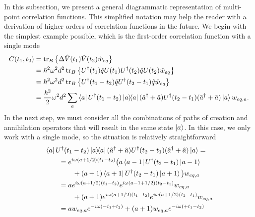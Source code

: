 In this subsection, we present a general diagrammatic representation of multi-point correlation functions. This simplified notation may help the reader with a derivation of higher orders of correlation functions in the future. We begin with the simplest example possible, which is the first-order correlation function with a single mode
\begin{equation}
\label{corr_fun_1st_derivation_1}
    \begin{aligned}
        C(t_1, t_2) &= \operatorname{tr}_B \big\{ \Delta \hat{V}(t_1) \hat{V}(t_2) \hat{w}_{eq} \big\} \\
        &= \hbar^2 \omega^2 d^2 \operatorname{tr}_B \big\{ U^\dagger(t_1)\hat{q}U(t_1) U^\dagger(t_2)\hat{q}U(t_2) 
 \hat{w}_{eq} \big\} \\
 &= \hbar^2 \omega^2 d^2 \operatorname{tr}_B \big\{ U^\dagger(t_1-t_2)\hat{q} U^\dagger(t_2-t_1)\hat{q} 
 \hat{w}_{eq} \big\} \\
 &= \frac{\hbar^2}{2} \omega^2 d^2 \sum_a \bra{a} U^\dagger(t_1-t_2)\ketbra{a}(\hat{a}^\dagger + \hat{a})U^\dagger(t_2-t_1)(\hat{a}^\dagger + \hat{a}) \ket{a}
 w_{eq, a} .
    \end{aligned}
\end{equation}
In the next step, we must consider all the combinations of paths of creation and annihilation operators that will result in the same state $\ket{a}$. In this case, we only work with a single mode, so the situation is relatively straightforward
\begin{equation}
\label{corr_fun_1st_derivation_2}
    \begin{aligned}
        &\bra{a} U^\dagger(t_1-t_2)\ketbra{a}(\hat{a}^\dagger + \hat{a})U^\dagger(t_2-t_1)(\hat{a}^\dagger + \hat{a}) \ket{a} = \\
        &\quad\quad = e^{i \omega (a+1/2) (t_1-t_2)} \big( a\bra{a-1}U^\dagger(t_2-t_1)\ket{a-1} \\
        &\quad\quad \quad\quad +(a+1)\bra{a+1}U^\dagger(t_2-t_1)\ket{a+1}\big) w_{eq, a} \\
        &\quad\quad = a e^{i \omega (a+1/2) (t_1-t_2)} e^{i \omega (a-1+1/2) (t_2-t_1)} w_{eq, a}  \\
        &\quad\quad \quad\quad +(a+1) e^{i \omega (a+1/2) (t_1-t_2)} e^{i \omega (a+1/2) (t_2-t_1)} w_{eq, a} \\
        &\quad\quad = a w_{eq, a} e^{ - i \omega (-t_1+t_2)} + (a+1) w_{eq, a} e^{ - i \omega (+t_1-t_2)}  \\
    \end{aligned}
\end{equation}
